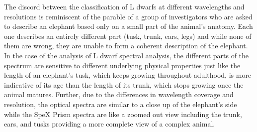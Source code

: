 \documentclass[12pt,preprint]{aastex}
\begin{document}
The discord between the classification of L dwarfs at different wavelengths and resolutions is reminiscent of the parable of a group of investigators who are asked to describe an elephant based only on a small part of the animal's anatomy. 
Each one describes an entirely different part (tusk, trunk, ears, legs) and while none of them are wrong, they are unable to form a coherent description of the elephant.
In the case of the analysis of L dwarf spectral analysis, the different parts of the spectrum are sensitive to different underlying physical properties just like the length of an elephant's tusk, which keeps growing throughout adulthood, is more indicative of its age than the length of its trunk, which stops growing once the animal matures. 
Further, due to the differences in wavelength coverage and resolution, the optical spectra are similar to a close up of the elephant's side while the SpeX Prism spectra are like a zoomed out view including the trunk, ears, and tusks providing a more complete view of a complex animal.

\end{document}
